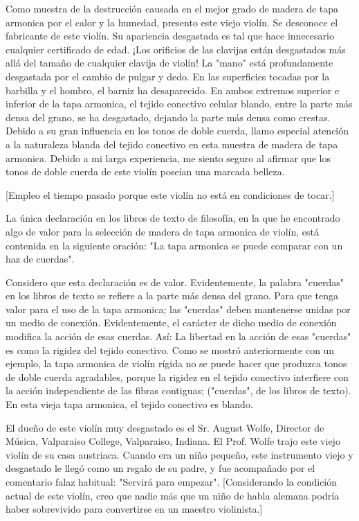 \documentclass[12pt]{book}
\begin{document}
Como muestra de la destrucción causada en el mejor grado de madera de tapa armonica por el calor y la humedad, presento este viejo violín. Se desconoce el fabricante de este violín. Su apariencia desgastada es tal que hace innecesario cualquier certificado de edad. ¡Los orificios de las clavijas están desgastados más allá del tamaño de cualquier clavija de violín! La "mano" está profundamente desgastada por el cambio de pulgar y dedo. En las superficies tocadas por la barbilla y el hombro, el barniz ha desaparecido. En ambos extremos superior e inferior de la tapa armonica, el tejido conectivo celular blando, entre la parte más densa del grano, se ha desgastado, dejando la parte más densa como crestas. Debido a su gran influencia en los tonos de doble cuerda, llamo especial atención a la naturaleza blanda del tejido conectivo en esta muestra de madera de tapa armonica. Debido a mi larga experiencia, me siento seguro al afirmar que los tonos de doble cuerda de este violín poseían una marcada belleza.

[Empleo el tiempo pasado porque este violín no está en condiciones de tocar.]

La única declaración en los libros de texto de filosofía, en la que he encontrado algo de valor para la selección de madera de tapa armonica de violín, está contenida en la siguiente oración: "La tapa armonica se puede comparar con un haz de cuerdas".

Considero que esta declaración es de valor. Evidentemente, la palabra "cuerdas" en los libros de texto se refiere a la parte más densa del grano. Para que tenga valor para el uso de la tapa armonica; las "cuerdas" deben mantenerse unidas por un medio de conexión. Evidentemente, el carácter de dicho medio de conexión modifica la acción de esas cuerdas. Así: La libertad en la acción de esas "cuerdas" es como la rigidez del tejido conectivo. Como se mostró anteriormente con un ejemplo, la tapa armonica de violín rígida no se puede hacer que produzca tonos de doble cuerda agradables, porque la rigidez en el tejido conectivo interfiere con la acción independiente de las fibras contiguas; ("cuerdas", de los libros de texto). En esta vieja tapa armonica, el tejido conectivo es blando.

El dueño de este violín muy desgastado es el Sr. August Wolfe, Director de Música, Valparaiso College, Valparaiso, Indiana. El Prof. Wolfe trajo este viejo violín de su casa austriaca. Cuando era un niño pequeño, este instrumento viejo y desgastado le llegó como un regalo de su padre, y fue acompañado por el comentario falaz habitual: "Servirá para empezar". [Considerando la condición actual de este violín, creo que nadie más que un niño de habla alemana podría haber sobrevivido para convertirse en un maestro violinista.]
\end{document}
